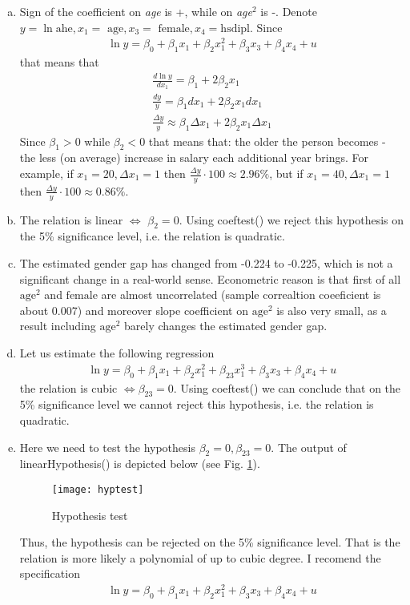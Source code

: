 \documentclass[a4paper]{article}
\begin{document}
\begin{enumerate}[(a)]
	\item Sign of the coefficient on \textit{age} is +, while on \textit{age}$^2$ is -. Denote $y = \ln \text{ahe}, x_1 = \text{ age}, x_3 = \text{ female}, x_4 = \text{hsdipl}$. Since 
	\begin{align*}
	\ln y = \beta_0 + \beta_1x_1 + \beta_2x_1^2 + \beta_3x_3 + \beta_4x_4 +u
	\end{align*}
	that means that
	\begin{align*}
	\frac{d \ln y}{d x_1} = \beta_1 + 2\beta_2x_1\\
	\frac{dy}{y} = \beta_1dx_1 + 2\beta_2 x_1 dx_1 \\
	\frac{\Delta y}{y} \approx \beta_1\Delta x_1 + 2\beta_2 x_1 \Delta x_1
	\end{align*}
	Since $\beta_1 > 0$ while $\beta_2 < 0$ that means that: the older the person becomes - the less (on average) increase in salary each additional year brings. For example, if $x_1 = 20, \Delta x_1 = 1$ then $\frac{\Delta y}{y} \cdot 100 \approx 2.96 \%$, but if $x_1 = 40, \Delta x_1 = 1$ then $\frac{\Delta y}{y} \cdot 100 \approx 0.86 \%$.
	\item The relation is linear $\iff$ $\beta_2 = 0$. Using coeftest() we reject this hypothesis on the 5\% significance level, i.e. the relation is quadratic.
	\item The estimated gender gap has changed from -0.224 to -0.225, which is not a significant change in a real-world sense. Econometric reason is that first of all $\text{age}^2$ and $\text{female}$ are almost uncorrelated (sample correaltion coeeficient is about 0.007) and moreover slope coefficient on $\text{age}^2$ is also very small, as a result including $\text{age}^2$ barely changes the estimated gender gap.
	\item Let us estimate the following regression
	\begin{align*}
	\ln y = \beta_0 + \beta_1x_1 + \beta_2x_1^2 + \beta_{23}x_1^3+ \beta_3x_3 + \beta_4x_4 +u
	\end{align*}
	the relation is cubic $\iff \beta_{23} = 0$. Using coeftest() we can conclude that on the 5\% significance level we cannot reject this hypothesis, i.e. the relation is quadratic.
	\item Here we need to test the hypothesis $\beta_2 = 0, \beta_{23} = 0$. The output of linearHypothesis() is depicted below (see Fig. \ref{fig3}).
	
	\begin{figure}[h]
		\centering
		\texttt{[image: hyptest]}
		\caption{Hypothesis test}\label{fig3}
	\end{figure}


	Thus, the hypothesis can be rejected on the 5\% significance level. That is the relation is more likely a polynomial of up to cubic degree. I recomend the specification
	\begin{align*}
	\ln y = \beta_0 + \beta_1x_1 + \beta_2x_1^2 + \beta_3x_3 + \beta_4x_4 +u
	\end{align*}
\end{enumerate}
\end{document}

